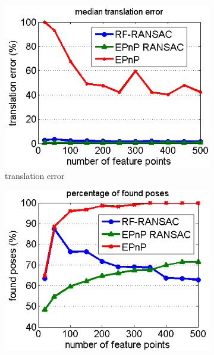 \documentclass[annual]{acmsiggraph}
\begin{document}
  
\begin{figure}[h]
\center

\begin{subfigure}[c]{0.48\columnwidth} 
	\includegraphics[width=\textwidth]{images/fixed_tau20_rfff20_t.png} 
	\caption{translation error}
	\label{img:eval:medErr:t}
\end{subfigure}
\begin{subfigure}[c]{0.48\columnwidth} 
	\includegraphics[width=\textwidth]{images/fixed_tau20_rfff20_found.png} 

\end{subfigure}
\end{figure}
\end{document}
